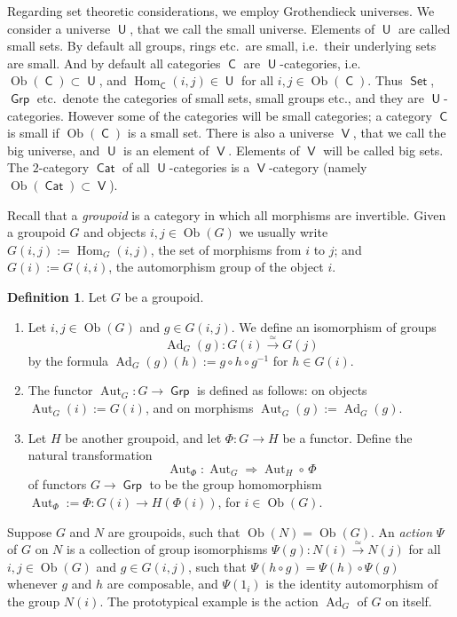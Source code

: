 \documentclass[a4paper, 10pt]{amsart}
\theoremstyle{definition}
\newtheorem{dfn}[equation]{Definition}
\numberwithin{equation}{section}
\newcommand{\iso}{\xrightarrow{\simeq}}
\newcommand{\opn}{\operatorname}
\newcommand{\cat}[1]{\operatorname{\mathsf{#1}}}
\newcommand{\bsym}[1]{\boldsymbol{#1}}
\newcommand{\twoto}{\Rightarrow}
\newcommand{\twocat}[1]{\operatorname{\bsym{\cat{#1}}}}
\begin{document}
Regarding set theoretic considerations, we employ Grothendieck universes. We 
consider a universe $\cat{U}$, that we call the small universe. Elements of
$\cat{U}$ are called small sets. By default all groups, rings etc.\ are small,
i.e.\ their underlying sets are small. And by default all categories $\cat{C}$
are $\cat{U}$-categories, i.e.\ $\opn{Ob}(\cat{C}) \subset \cat{U}$, and 
$\opn{Hom}_{\cat{C}}(i, j) \in \cat{U}$
for all $i, j \in \opn{Ob}(\cat{C})$.  Thus $\cat{Set}$, $\cat{Grp}$ etc.\
denote the categories of small sets, small groups etc., and they are
$\cat{U}$-categories. However some of the categories will be small categories;
a category $\cat{C}$ is small if $\opn{Ob}(\cat{C})$ is a small set.
There is also a universe $\cat{V}$, that we call the big universe, and 
$\cat{U}$ is an element of $\cat{V}$. Elements of $\cat{V}$ will be called big
sets. The $2$-category 
$\twocat{Cat}$ of all $\cat{U}$-categories is a $\cat{V}$-category (namely 
$\opn{Ob}(\twocat{Cat}) \subset \cat{V}$).  

Recall that a {\em groupoid} is a category in which all morphisms are
invertible. Given a groupoid $G$ and objects $i, j \in \opn{Ob}(G)$
we usually write
$G(i, j) := \opn{Hom}_{G}(i, j)$,
the set of morphisms from $i$ to $j$; and 
$G(i) := G(i, i)$, the automorphism group of the object $i$. 

\begin{dfn} \label{dfn:204}
Let $G$ be a groupoid.
\begin{enumerate}
\item Let $i, j \in \opn{Ob} (G)$ and $g \in G(i, j)$.  We define an isomorphism
of groups
\[ \opn{Ad}_{G}(g) : G(i) \iso G(j)  \]
by the formula
$\opn{Ad}_{G}(g)(h) := g \circ h \circ g^{-1}$
for $h \in G(i)$. 

\item The functor 
$\opn{Aut}_{G} : G \to \cat{Grp}$
is defined as follows: on objects $\opn{Aut}_{G}(i) := G(i)$, and on morphisms 
$\opn{Aut}_{G}(g) := \opn{Ad}_{G}(g)$. 

\item Let $H$ be another groupoid, and let $\Phi : G \to H$ be a functor. 
Define the natural transformation 
\[ \opn{Aut}_{\Phi} : \opn{Aut}_{G} \twoto \opn{Aut}_{H} \circ \, \Phi \]
of functors $G \to \cat{Grp}$ to be the group homomorphism
$\opn{Aut}_{\Phi} := \Phi : G(i) \to H(\Phi(i))$, for $i \in \opn{Ob}(G)$.
\end{enumerate} 
\end{dfn}

Suppose $G$ and $N$ are groupoids, such that 
$\opn{Ob}(N) = \opn{Ob}(G)$. 
An {\em action} $\Psi$ of $G$ on 
$N$ is a collection of group isomorphisms 
$\Psi(g) : N(i) \iso N(j)$
for all $i, j \in \opn{Ob}(G)$ and $g \in G(i, j)$, 
such that 
$\Psi(h \circ g) = \Psi(h) \circ \Psi(g)$
whenever $g$ and $h$ are composable, and 
$\Psi(1_i)$ is the identity automorphism of the group $N(i)$. 
The prototypical example is the action $\opn{Ad}_{G}$ of $G$ on itself. 
\end{document}
